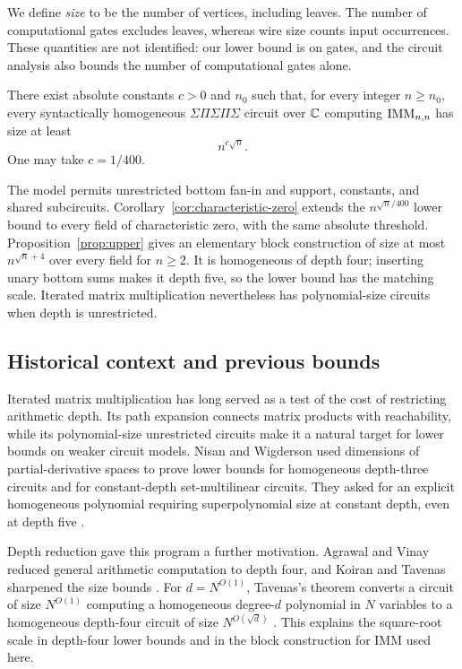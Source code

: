 We define \emph{size} to be the number of vertices, including leaves.  The
number of computational gates excludes leaves, whereas wire size counts
input occurrences.  These quantities are not identified: our lower bound is
on gates, and the circuit analysis also bounds the number of computational
gates alone.

\begin{theorem}
\label{thm:main}
There exist absolute constants $c>0$ and $n_0$ such that, for every integer
$n\geq n_0$, every syntactically homogeneous
$\Sigma\Pi\Sigma\Pi\Sigma$ circuit over $\mathbb C$ computing $\operatorname{IMM}_{n,n}$
has size at least
\[
 n^{c\sqrt n}.
\]
One may take $c=1/400$.
\end{theorem}

The model permits unrestricted bottom fan-in and support, constants, and
shared subcircuits.  Corollary~\ref{cor:characteristic-zero} extends the
$n^{\sqrt n/400}$ lower bound to every field of characteristic zero, with
the same absolute threshold.  Proposition~\ref{prop:upper} gives an
elementary block construction of size at most $n^{\sqrt n+4}$ over every
field for $n\geq2$.  It is homogeneous of depth four; inserting unary bottom
sums makes it depth five, so the lower bound has the matching scale.
Iterated matrix multiplication nevertheless has polynomial-size circuits
when depth is unrestricted.

\subsection{Historical context and previous bounds}

Iterated matrix multiplication has long served as a test of the cost of
restricting arithmetic depth.  Its path expansion connects matrix products
with reachability, while its polynomial-size unrestricted circuits make it
a natural target for lower bounds on weaker circuit models.
Nisan and Wigderson used dimensions of partial-derivative spaces to prove
lower bounds for homogeneous depth-three circuits and for constant-depth
set-multilinear circuits.  They asked for an explicit homogeneous polynomial
requiring superpolynomial size at constant depth, even at depth five
\cite[Section~2.2 of the linked author journal manuscript]{NisanWigderson1995}.

Depth reduction gave this program a further motivation.
Agrawal and Vinay reduced general arithmetic computation to depth four,
and Koiran and Tavenas sharpened the size bounds
\cite{AgrawalVinay2008,Koiran2012,Tavenas2013}.
For $d=N^{O(1)}$, Tavenas's theorem converts a circuit of size
$N^{O(1)}$ computing a homogeneous degree-$d$ polynomial in $N$ variables
to a homogeneous depth-four circuit of size $N^{O(\sqrt d)}$
\cite[Theorem~1 of the linked preprint]{Tavenas2013}.
This explains the square-root scale in depth-four lower bounds and in the
block construction for IMM used here.

